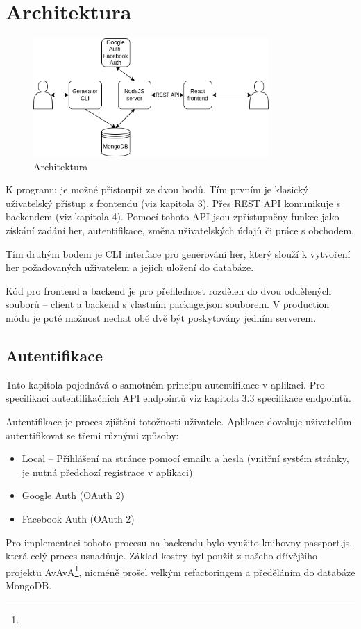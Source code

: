 \documentclass[a4paper,oneside,12pt]{report}
\begin{document}
\chapter{Architektura}

\begin{figure}[H]
   \centering
   \includegraphics[width=0.8\textwidth]{../img/architecture.png}
   \caption[Architektura]{Architektura}
   \label{fig:architecture}
\end{figure}

K programu je možné přistoupit ze dvou bodů. Tím prvním je klasický uživatelský přístup z frontendu (viz kapitola 3). Přes REST API komunikuje s backendem (viz kapitola 4). Pomocí tohoto API jsou zpřístupněny funkce jako získání zadání her, autentifikace, změna uživatelských údajů či práce s obchodem.

Tím druhým bodem je CLI interface pro generování her, který slouží k vytvoření her požadovaných uživatelem a jejich uložení do databáze.

Kód pro frontend a backend je pro přehlednost rozdělen do dvou oddělených souborů -- client a backend s vlastním package.json souborem. V production módu je poté možnost nechat obě dvě být poskytovány jedním serverem.

\section{Autentifikace}

Tato kapitola pojednává o samotném principu autentifikace v aplikaci. Pro specifikaci autentifikačních API endpointů viz kapitola 3.3 specifikace endpointů.

Autentifikace je proces zjištění totožnosti uživatele. Aplikace dovoluje uživatelům autentifikovat se třemi různými způsoby:
\begin{itemize}
   \item Local -- Přihlášení na stránce pomocí emailu a hesla (vnitřní systém stránky, je nutná předchozí registrace v aplikaci)
   \item Google Auth (OAuth 2)
   \item Facebook Auth (OAuth 2)
\end{itemize}
Pro implementaci tohoto procesu na backendu bylo využito knihovny passport.js, která celý proces usnadňuje. Základ kostry byl použit z našeho dřívějšího projektu AvAvA\footnote{}, nicméně prošel velkým refactoringem a předěláním do databáze MongoDB.
\end{document}
